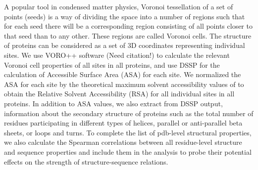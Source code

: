 \documentclass[12pt]{article}
\begin{document}
\indent A popular tool in condensed matter physics, Voronoi tessellation of a set of points (seeds) is a way of dividing the space into a number of regions such that for each seed there will be a corresponding region consisting of all points closer to that seed than to any other. These regions are called Voronoi cells. The structure of proteins can be considered as a set of 3D coordinates representing individual sites. We use VORO++ software {\color{red}(Need citation!)} to calculate the relevant Voronoi cell properties of all sites in all proteins, and use DSSP \citep{Kabschetal2005}  for the calculation of Accessible Surface Area (ASA) for each site. We normalized the ASA for each site by the theoretical maximum solvent accessibility values of \cite{Tienetal2013}  to obtain the Relative Solvent Accessibility (RSA) for all individual sites in all proteins. In addition to ASA values, we also extract from DSSP output, information about the secondary structure of proteins such as the total number of residues participating in different types of helices, parallel or anti-parallel beta sheets, or loops and turns. To complete the list of pdb-level structural properties, we also calculate the Spearman correlations between all residue-level structure and sequence properties and include them in the analysis to probe their potential effects on the strength of structure-sequence relations. \\
\end{document}
